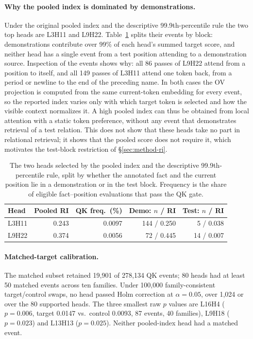 \paragraph{Why the pooled index is dominated by demonstrations.}
Under the original pooled index and the descriptive 99.9th-percentile rule the two
top heads are L3H11 and L9H22. Table~\ref{tab:pooled} splits their events by block:
demonstrations contribute over 99\% of each head's summed target score, and neither
head has a single event from a test position attending to a demonstration source.
Inspection of the events shows why: all 86 passes of L9H22 attend from a position to
itself, and all 149 passes of L3H11 attend one token back, from a period or newline
to the end of the preceding name. In both cases the OV projection is computed from
the same current-token embedding for every event, so the reported index varies only
with which target token is selected and how the visible context normalizes it. A
high pooled index can thus be obtained from local attention with a static token
preference, without any event that demonstrates retrieval of a test relation. This
does not show that these heads take no part in relational retrieval; it shows that
the pooled score does not require it, which motivates the test-block restriction of
\S\ref{sec:method-ri}.

\begin{table}[h]
\centering\scriptsize
\setlength{\tabcolsep}{3pt}
\begin{tabular}{@{}lrrrr@{}}
\toprule
Head & Pooled RI & QK freq.\ (\%) & Demo: $n$ / RI & Test: $n$ / RI \\
\midrule
L3H11 & 0.243 & 0.0097 & 144 / 0.250 & 5 / 0.038 \\
L9H22 & 0.374 & 0.0056 & 72 / 0.445 & 14 / 0.007 \\
\bottomrule
\end{tabular}
\caption{The two heads selected by the pooled index and the descriptive
99.9th-percentile rule, split by whether the annotated fact and the current position
lie in a demonstration or in the test block. Frequency is the share of eligible
fact--position evaluations that pass the QK gate.}
\label{tab:pooled}
\end{table}

\paragraph{Matched-target calibration.}
The matched subset retained 19,901 of 278,134 QK events; 80 heads had at least 50
matched events across ten families. Under 100{,}000 family-consistent target/control
swaps, no head passed Holm correction at $\alpha{=}0.05$, over 1,024 or over the 80
supported heads. The three smallest raw $p$ values are L16H4 ($p{=}0.006$, target
0.0147 vs.\ control 0.0093, 87 events, 40 families), L9H18 ($p{=}0.023$) and L13H13
($p{=}0.025$). Neither pooled-index head had a matched event.

